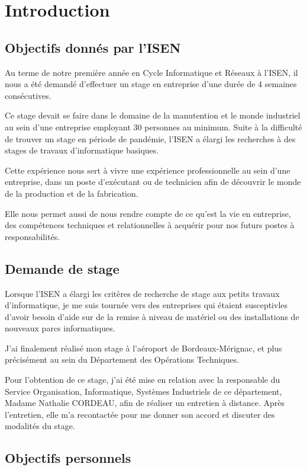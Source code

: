 \chapter{Introduction}

\section{Objectifs donnés par l'ISEN}


Au terme de notre première année en Cycle Informatique et Réseaux à l’ISEN, il nous a été demandé d’effectuer un stage en entreprise d’une durée de 4 semaines consécutives.


Ce stage devait se faire dans le domaine de la manutention et le monde industriel au sein d’une entreprise employant 30 personnes au minimum. Suite à la difficulté de trouver un stage en période de pandémie, l’ISEN a élargi les recherches à des stages de travaux d’informatique basiques.


Cette expérience nous sert à vivre une expérience professionnelle au sein d’une entreprise, dans un poste d’exécutant ou de technicien afin de découvrir le monde de la production et de la fabrication.


Elle nous permet aussi de nous rendre compte de ce qu'est la vie en entreprise, des compétences techniques et relationnelles à acquérir pour nos futurs postes à responsabilités.


\section{Demande de stage}

Lorsque l’ISEN a élargi les critères de recherche de stage aux petits travaux d’informatique, je me suis tournée vers des entreprises qui étaient susceptivles d'avoir besoin d’aide sur de la remise à niveau de matériel ou des installations de nouveaux parcs informatiques.


J’ai finalement réalisé mon stage à l’aéroport de Bordeaux-Mérignac, et plus précisément au sein du Département des Opérations Techniques.


Pour l’obtention de ce stage, j’ai été mise en relation avec la responsable du Service Organisation, Informatique, Systèmes Industriels de ce département, Madame Nathalie CORDEAU, afin de réaliser un entretien à distance. Après l’entretien, elle m'a recontactée pour me donner son accord et discuter des modalités du stage.


\section{Objectifs personnels}

